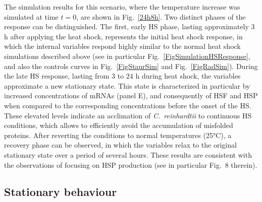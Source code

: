 \documentclass[oneside, 10pt, a4paper, twocolumn]{article}
\begin{document}
The simulation results for this scenario, where the temperature increase was simulated at time $t=0$, are shown in Fig.~\ref{24h8h}.
Two distinct phases of the response can be distinguished. The first, early HS phase, lasting approximately $3$ h after applying the heat shock, 
represents the initial heat shock response, in which the internal variables respond highly similar to 
the normal heat shock simulations described above (see in particular Fig.~\ref{FigSimulationHSResponse}, and also the controls curves in Fig.~\ref{FigStaurSim} and Fig.~\ref{FigRadSim}). 
During the late HS response, lasting from $3$ to $24$ h during heat shock, the variables approximate 
a new stationary state.  
This state is characterized in particular by increased concentrations of mRNAs (panel E), and consequently 
of HSF and HSP when compared to the corresponding concentrations before the onset of the HS. 
These elevated levels indicate an acclimation of \textit{C.~reinhardtii} to continuous HS conditions,
which allows to efficiently avoid the accumulation of misfolded proteins.
After reverting the conditions to normal temperatures (25°C), a recovery phase can be observed, in which
the variables relax to the original stationary state over a period of several hours.
These results are consistent with the observations of \cite{Hemme2014} focusing on HSP production (see in particular Fig.~8 therein).









\subsection{Stationary behaviour}
\label{SecSteadyStateConcentrations}
\end{document}
